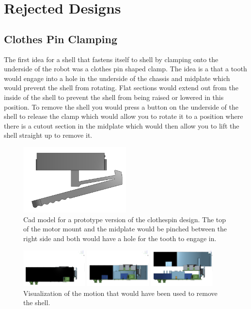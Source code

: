 \documentclass{iopart}
\begin{document}
\section{Rejected Designs}
\subsection{Clothes Pin Clamping}
The first idea for a shell that fastens itself to shell by clamping onto the underside of the robot was a clothes pin shaped clamp. The idea is a that a tooth would engage into a hole in the underside of the chassis and midplate which would prevent the shell from rotating. Flat sections would extend out from the inside of the shell to prevent the shell from being raised or lowered in this position. To remove the shell you would press a button on the underside of the shell to release the clamp which would allow you to rotate it to a position where there is a cutout section in the midplate which would then allow you to lift the shell straight up to remove it.

\begin{figure}[h!]
    \centering
    \includegraphics[width=0.5\textwidth]{graphics/clothespin_clamp.png}\\
    Cad model for a prototype version of the clothespin design. The top of the motor mount and the midplate would be pinched between the right side and both would have a hole for the tooth to engage in.
\end{figure}

\begin{figure}[h!]
    \centering
    \includegraphics[width=0.3\textwidth]{graphics/clothespin_shell_removal1.png}
    \includegraphics[width=0.3\textwidth]{graphics/clothespin_shell_removal2.png}
    \includegraphics[width=0.3\textwidth]{graphics/clothespin_shell_removal3.png}
    Visualization of the motion that would have been used to remove the shell.
\end{figure}
\end{document}
